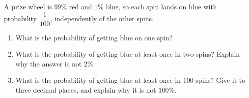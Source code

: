 A prize wheel is $99\%$ red and $1\%$ blue, so each spin lands on blue with probability $\dfrac{1}{100}$, independently of the other spins.
\begin{enumerate}
\item[(a)] What is the probability of getting blue on one spin?
\item[(b)] What is the probability of getting blue at least once in two spins? Explain why the answer is not $2\%$.
\item[(c)] What is the probability of getting blue at least once in $100$ spins? Give it to three decimal places, and explain why it is not $100\%$.
\end{enumerate}
